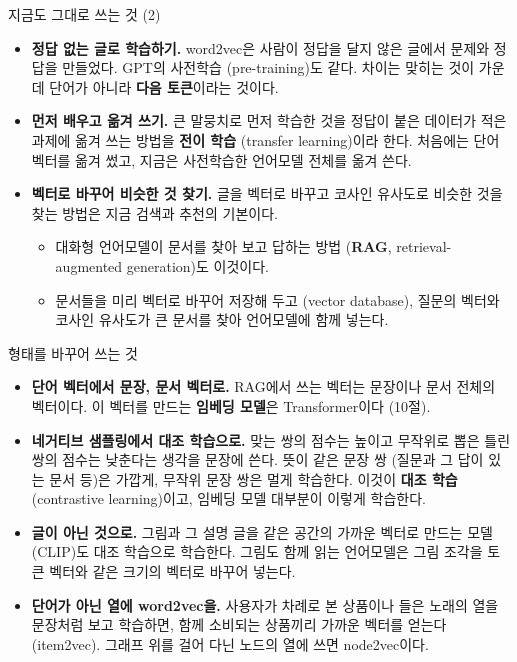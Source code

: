 \documentclass[aspectratio=169,11pt]{beamer}
\begin{document}
\begin{frame}{지금도 그대로 쓰는 것 (2)}
\begin{itemize}
\item \textbf{정답 없는 글로 학습하기.}
word2vec은 사람이 정답을 달지 않은 글에서 문제와 정답을 만들었다.
GPT의 사전학습 (pre-training)도 같다. 차이는 맞히는 것이 가운데 단어가 아니라 \textbf{다음 토큰}이라는 것이다.
\item \textbf{먼저 배우고 옮겨 쓰기.}
큰 말뭉치로 먼저 학습한 것을 정답이 붙은 데이터가 적은 과제에 옮겨 쓰는 방법을 \textbf{전이 학습} (transfer learning)이라 한다.
처음에는 단어 벡터를 옮겨 썼고, 지금은 사전학습한 언어모델 전체를 옮겨 쓴다.
\item \textbf{벡터로 바꾸어 비슷한 것 찾기.}
글을 벡터로 바꾸고 코사인 유사도로 비슷한 것을 찾는 방법은 지금 검색과 추천의 기본이다.
\begin{itemize}
\item 대화형 언어모델이 문서를 찾아 보고 답하는 방법 (\textbf{RAG}, retrieval-augmented generation)도 이것이다.
\item 문서들을 미리 벡터로 바꾸어 저장해 두고 (vector database), 질문의 벡터와 코사인 유사도가 큰 문서를 찾아 언어모델에 함께 넣는다.
\end{itemize}
\end{itemize}
\end{frame}

\begin{frame}{형태를 바꾸어 쓰는 것}
\begin{itemize}
\item \textbf{단어 벡터에서 문장, 문서 벡터로.}
RAG에서 쓰는 벡터는 문장이나 문서 전체의 벡터이다. 이 벡터를 만드는 \textbf{임베딩 모델}은 Transformer이다 (10절).
\item \textbf{네거티브 샘플링에서 대조 학습으로.}
맞는 쌍의 점수는 높이고 무작위로 뽑은 틀린 쌍의 점수는 낮춘다는 생각을 문장에 쓴다.
뜻이 같은 문장 쌍 (질문과 그 답이 있는 문서 등)은 가깝게, 무작위 문장 쌍은 멀게 학습한다.
이것이 \textbf{대조 학습} (contrastive learning)이고, 임베딩 모델 대부분이 이렇게 학습한다.
\item \textbf{글이 아닌 것으로.}
그림과 그 설명 글을 같은 공간의 가까운 벡터로 만드는 모델 (CLIP)도 대조 학습으로 학습한다.
그림도 함께 읽는 언어모델은 그림 조각을 토큰 벡터와 같은 크기의 벡터로 바꾸어 넣는다.
\item \textbf{단어가 아닌 열에 word2vec을.}
사용자가 차례로 본 상품이나 들은 노래의 열을 문장처럼 보고 학습하면, 함께 소비되는 상품끼리 가까운 벡터를 얻는다 (item2vec).
그래프 위를 걸어 다닌 노드의 열에 쓰면 node2vec이다.
\end{itemize}
\end{frame}
\end{document}
